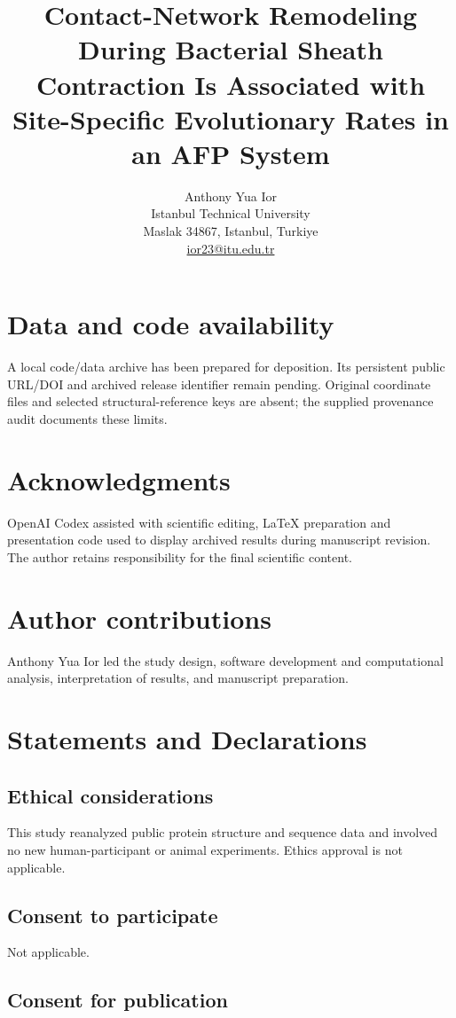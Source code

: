 \documentclass[11pt,a4paper]{article}
\title{Contact-Network Remodeling During Bacterial Sheath Contraction Is Associated with Site-Specific Evolutionary Rates in an AFP System}
\author{Anthony Yua Ior\\[0.5em]
\small Istanbul Technical University\\
\small Maslak 34867, Istanbul, Turkiye\\
\small \href{mailto:ior23@itu.edu.tr}{ior23@itu.edu.tr}}
\date{}
\begin{document}
\maketitle
\section*{Data and code availability}
A local code/data archive has been prepared for deposition. Its persistent public URL/DOI
and archived release identifier remain pending. Original coordinate files and selected
structural-reference keys are absent; the supplied provenance audit documents these limits.
\section{Acknowledgments}

OpenAI Codex assisted with scientific editing, LaTeX preparation and presentation code used to display archived results during manuscript revision. The author retains responsibility for the final scientific content.

\section{Author contributions}

Anthony Yua Ior led the study design, software development and computational analysis, interpretation of results, and manuscript preparation.

\section{Statements and Declarations}

\subsection{Ethical considerations}

This study reanalyzed public protein structure and sequence data and involved no new human-participant or animal experiments. Ethics approval is not applicable.

\subsection{Consent to participate}

Not applicable.

\subsection{Consent for publication}
\end{document}
